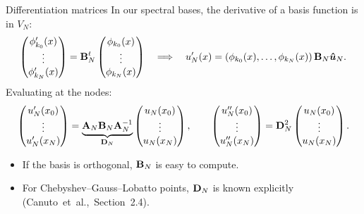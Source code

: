 \begin{frame}{Differentiation matrices}
    In our spectral bases, the derivative of a basis function is in $V_N$:
    \[
        \begin{pmatrix} \phi_{k_0}'(x) \\ \vdots \\ \phi_{k_N}'(x) \end{pmatrix}
        = \mathbf{B}_N^t
        \begin{pmatrix} \phi_{k_0}(x) \\ \vdots \\ \phi_{k_N}(x) \end{pmatrix}
        \quad \Longrightarrow \quad
        u_N'(x) = (\phi_{k_0}(x), \dots, \phi_{k_N}(x))\, \mathbf{B}_N \bm{\hat u}_N .
    \]
    Evaluating at the nodes:
    \[
        \begin{pmatrix} u_N'(x_0) \\ \vdots \\ u_N'(x_N) \end{pmatrix}
        = \underbrace{\mathbf{A}_N \mathbf{B}_N \mathbf{A}_N^{-1}}_{\mathbf{D}_N}
        \begin{pmatrix} u_N(x_0) \\ \vdots \\ u_N(x_N) \end{pmatrix},
        \qquad
        \begin{pmatrix} u_N''(x_0) \\ \vdots \\ u_N''(x_N) \end{pmatrix}
        = \mathbf{D}_N^2
        \begin{pmatrix} u_N(x_0) \\ \vdots \\ u_N(x_N) \end{pmatrix}.
    \]
    \begin{itemize}
        \item If the basis is orthogonal, $\mathbf{B}_N$ is easy to compute.
        \item For Chebyshev--Gauss--Lobatto points, $\mathbf{D}_N$ is known explicitly \mbox{(Canuto et al., Section 2.4).}
    \end{itemize}
\end{frame}

